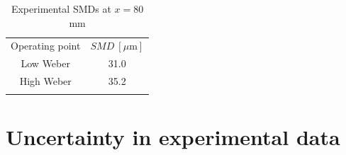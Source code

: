 \begin{table}[!h]
\centering
\caption{Experimental SMDs at $x = 80$ mm  }
\begin{tabular}{cc}
\thickhline
Operating point & $SMD~\left[ \mu \mathrm{m}\right]$  \\
\thickhline
Low Weber & 31.0  \\  
High Weber & 35.2 \\
\thickhline
\end{tabular}
\label{tab:becker_hassa_SMD_values_sprays}
\end{table}


\section{Uncertainty in experimental data}
\label{sec:jicf_dlr_experimental_uncertainty}

